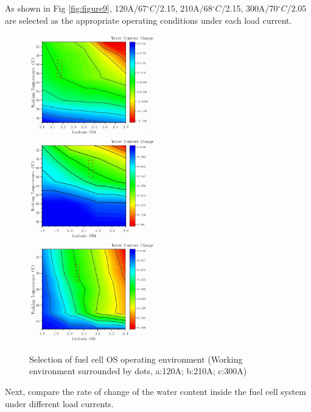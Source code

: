 As shown in Fig \ref{fig:figure9}, 120A/67$^{\circ}C$/2.15, 210A/68$^{\circ}C$/2.15, 300A/70$^{\circ}C$/2.05 are selected as the appropriate operating conditions under each load current.
\begin{figure}
	\label{fig:figure9}
		\label{fig:fig9a}
		\includegraphics[width=0.5\textwidth]{Research_pictures/fig9a.jpg}
		\label{fig:fig9b}
		\includegraphics[width=0.5\textwidth]{Research_pictures/fig9b.jpg}
		\label{fig:fig9c}
		\includegraphics[width=0.5\textwidth]{Research_pictures/fig9c.jpg}
	\caption{Selection of fuel cell OS operating environment (Working environment surrounded by dots, a:120A; b:210A; c:300A)}
\end{figure}
Next, compare the rate of change of the water content inside the fuel cell system under different load currents.

